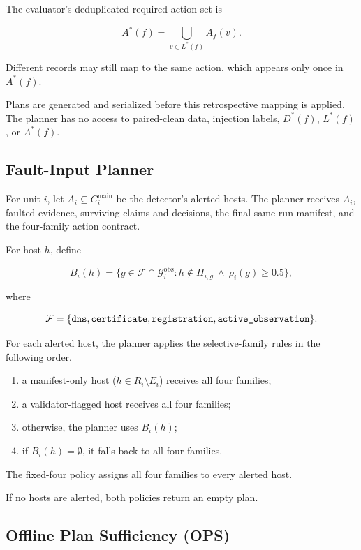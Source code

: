 \documentclass[sn-basic]{sn-jnl}%
\theoremstyle{thmstyleone}%
\theoremstyle{thmstyletwo}%
\theoremstyle{thmstylethree}%
\begin{document}
The evaluator's deduplicated required action set is

\[
A^{*}(f)=\bigcup_{v\in L^{*}(f)} A_f(v).
\]

Different records may still map to the same action, which appears only once in \(A^{*}(f)\).

Plans are generated and serialized before this retrospective mapping is applied. The planner has no access to paired-clean data, injection labels, \(D^{*}(f)\), \(L^{*}(f)\), or \(A^{*}(f)\).

\subsection{Fault-Input Planner}\label{sec:fault-input-planner}

For unit \(i\), let \(A_i\subseteq C_i^{\mathrm{main}}\) be the detector's alerted hosts. The planner receives \(A_i\), faulted evidence, surviving claims and decisions, the final same-run manifest, and the four-family action contract.

For host \(h\), define

\[
B_i(h)=\bigl\{g\in\mathcal F\cap\mathcal G_i^{\mathrm{obs}}:h\notin H_{i,g}\ \land\ \rho_i(g)\ge0.5\bigr\},
\]

where

\[
\mathcal F=\{\text{\texttt{dns}},\text{\texttt{certificate}},\text{\texttt{registration}},\text{\texttt{active\_observation}}\}.
\]

For each alerted host, the planner applies the selective-family rules in the following order.

\begin{enumerate}
\item a manifest-only host (\(h\in R_i\setminus E_i\)) receives all four families;

\item a validator-flagged host receives all four families;

\item otherwise, the planner uses \(B_i(h)\);

\item if \(B_i(h)=\emptyset\), it falls back to all four families.
\end{enumerate}

The fixed-four policy assigns all four families to every alerted host.

If no hosts are alerted, both policies return an empty plan.

\subsection{Offline Plan Sufficiency (OPS)}\label{sec:ops}
\end{document}

